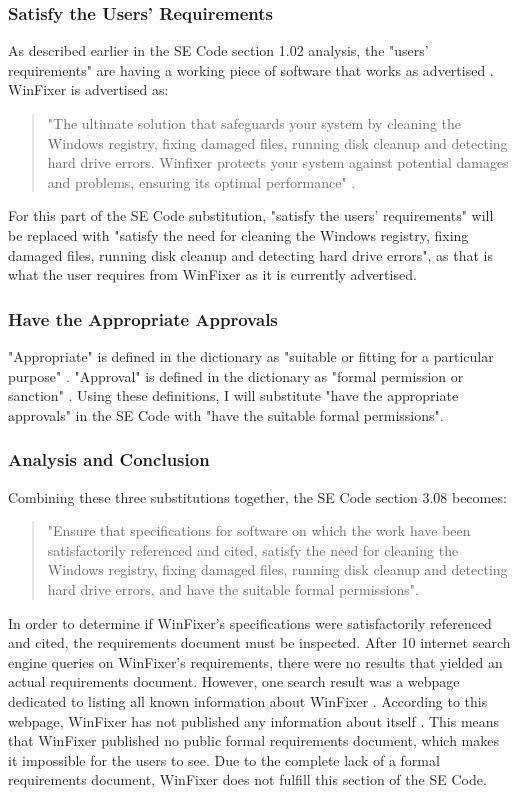 \documentclass[11pt]{article}
\begin{document}
\begin{multicols}{2}
\subsubsection{Satisfy the Users' Requirements}
As described earlier in the SE Code section 1.02 analysis, the "users' requirements" are having a working piece of software that works as advertised \cite{bbcmillionstricked}. WinFixer is advertised as:
\begin{quotation} "The ultimate solution that safeguards your system by cleaning the Windows registry, fixing damaged files, running disk cleanup and detecting hard drive errors. Winfixer protects your system against potential damages and problems, ensuring its optimal performance"  \cite{badwarewinfixer}.
\end{quotation}
For this part of the SE Code substitution, "satisfy the users' requirements" will be replaced with "satisfy the need for cleaning the Windows registry, fixing damaged files, running disk cleanup and detecting hard drive errors", as that is what the user requires from WinFixer as it is currently advertised.

\subsubsection{Have the Appropriate Approvals}
"Appropriate" is defined in the dictionary as "suitable or fitting for a particular purpose" \cite{dictionary}. "Approval" is defined in the dictionary as "formal permission or sanction" \cite{dictionary}. Using these definitions, I will substitute "have the appropriate approvals" in the SE Code with "have the suitable formal permissions".

\subsubsection{Analysis and Conclusion}
Combining these three substitutions together, the SE Code section 3.08 becomes:
\begin{quotation}
 "Ensure that specifications for software on which the work have been satisfactorily referenced and cited, satisfy the need for cleaning the Windows registry, fixing damaged files, running disk cleanup and detecting hard drive errors, and have the suitable formal permissions".
\end{quotation}
In order to determine if WinFixer's specifications were satisfactorily referenced and cited, the requirements document must be inspected. After 10 internet search engine queries on WinFixer's requirements, there were no results that yielded an actual requirements document. However, one search result was a webpage dedicated to listing all known information about WinFixer \cite{badwarewinfixer}. According to this webpage, WinFixer has not published any information about itself \cite{badwarewinfixer}.  This means that WinFixer published no public formal requirements document, which makes it impossible for the users to see. Due to the complete lack of a formal requirements document, WinFixer does not fulfill this section of the SE Code.


\end{multicols}
\end{document}
